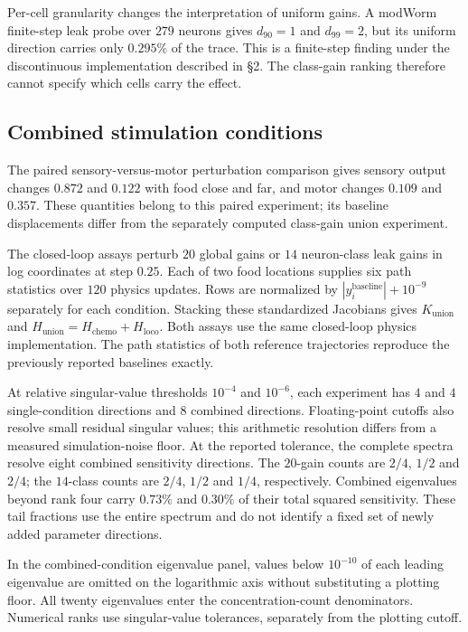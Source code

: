 \documentclass[11pt,letterpaper]{article}
\begin{document}
Per-cell granularity changes the interpretation of uniform gains. A modWorm finite-step leak probe over $279$ neurons gives $d_{90}=1$ and $d_{99}=2$, but its uniform direction carries only $0.295\%$ of the trace. This is a finite-step finding under the discontinuous implementation described in \S2. The class-gain ranking therefore cannot specify which cells carry the effect.

\subsection{Combined stimulation conditions}
The paired sensory-versus-motor perturbation comparison gives sensory output changes $0.872$ and $0.122$ with food close and far, and motor changes $0.109$ and $0.357$. These quantities belong to this paired experiment; its baseline displacements differ from the separately computed class-gain union experiment.

The closed-loop assays perturb $20$ global gains or $14$ neuron-class leak gains in log coordinates at step $0.25$. Each of two food locations supplies six path statistics over $120$ physics updates. Rows are normalized by $|y_i^{\mathrm{baseline}}|+10^{-9}$ separately for each condition. Stacking these standardized Jacobians gives $K_{\mathrm{union}}$ and $H_{\mathrm{union}}=H_{\mathrm{chemo}}+H_{\mathrm{loco}}$. Both assays use the same closed-loop physics implementation. The path statistics of both reference trajectories reproduce the previously reported baselines exactly.

At relative singular-value thresholds $10^{-4}$ and $10^{-6}$, each experiment has $4$ and $4$ single-condition directions and $8$ combined directions. Floating-point cutoffs also resolve small residual singular values; this arithmetic resolution differs from a measured simulation-noise floor. At the reported tolerance, the complete spectra resolve eight combined sensitivity directions. The $20$-gain counts are $2/4$, $1/2$ and $2/4$; the $14$-class counts are $2/4$, $1/2$ and $1/4$, respectively. Combined eigenvalues beyond rank four carry $0.73\%$ and $0.30\%$ of their total squared sensitivity. These tail fractions use the entire spectrum and do not identify a fixed set of newly added parameter directions.



In the combined-condition eigenvalue panel, values below $10^{-10}$ of each leading eigenvalue are omitted on the logarithmic axis without substituting a plotting floor. All twenty eigenvalues enter the concentration-count denominators. Numerical ranks use singular-value tolerances, separately from the plotting cutoff.
\end{document}
